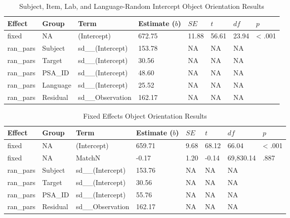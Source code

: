 \documentclass[
  man,floatsintext]{apa7}
\begin{document}
\begin{table}[tbp]

\begin{center}
\begin{threeparttable}

\caption{\label{tab:lang}Subject, Item, Lab, and Language-Random Intercept Object Orientation Results}

\begin{tabular}{llllllll}
\toprule
Effect & Group & Term & Estimate ($b$) & $SE$ & $t$ & $df$ & $p$\\
\midrule
fixed & NA & (Intercept) & 672.75 & 11.88 & 56.61 & 23.94 & < .001\\
ran\_pars & Subject & sd\_\_(Intercept) & 153.78 & NA & NA & NA & \\
ran\_pars & Target & sd\_\_(Intercept) & 30.56 & NA & NA & NA & \\
ran\_pars & PSA\_ID & sd\_\_(Intercept) & 48.60 & NA & NA & NA & \\
ran\_pars & Language & sd\_\_(Intercept) & 25.52 & NA & NA & NA & \\
ran\_pars & Residual & sd\_\_Observation & 162.17 & NA & NA & NA & \\
\bottomrule
\end{tabular}

\end{threeparttable}
\end{center}

\end{table}

\begin{table}[tbp]

\begin{center}
\begin{threeparttable}

\caption{\label{tab:fixed}Fixed Effects Object Orientation Results}

\begin{tabular}{llllllll}
\toprule
Effect & Group & Term & Estimate ($b$) & $SE$ & $t$ & $df$ & $p$\\
\midrule
fixed & NA & (Intercept) & 659.71 & 9.68 & 68.12 & 66.04 & < .001\\
fixed & NA & MatchN & -0.17 & 1.20 & -0.14 & 69,830.14 & .887\\
ran\_pars & Subject & sd\_\_(Intercept) & 153.76 & NA & NA & NA & \\
ran\_pars & Target & sd\_\_(Intercept) & 30.56 & NA & NA & NA & \\
ran\_pars & PSA\_ID & sd\_\_(Intercept) & 55.76 & NA & NA & NA & \\
ran\_pars & Residual & sd\_\_Observation & 162.17 & NA & NA & NA & \\
\bottomrule
\end{tabular}

\end{threeparttable}
\end{center}

\end{table}
\end{document}
